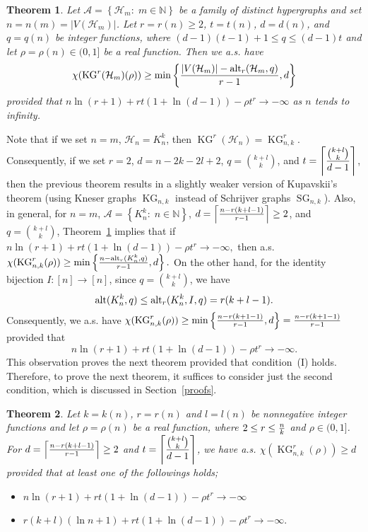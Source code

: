 \documentclass[11pt]{amsart}
\newtheorem{theorem}{Theorem} %
\theoremstyle{definition}
\theoremstyle{remark}
\def\ds{\displaystyle}
\def\KG{\operatorname{KG}}
\def\SG{\operatorname{SG}}
\def\alt{\operatorname{alt}}
\begin{document}
\begin{theorem}\label{thm:main}
Let ${\mathcal A}=\left\{\mathcal{H}_m:\; m\in\mathbb{N}\right\}$ be a 
family of distinct hypergraphs and set 
$n=n(m)=|V(\mathcal{H}_m)|$.  Let $r=r(n)\geq 2$, $t=t(n)$, $d=d(n)$, 
and $q=q(n)$ be integer functions, where $(d-1)(t-1)+1\leq q\leq (d-1)t$ and 
let $\rho=\rho(n)\in(0,1]$ be a real function. Then we a.s. have $$\chi(\KG^r(\mathcal{H}_m)(\rho))\geq \min\left\{{|V(\mathcal{H}_m)|-{\rm alt}_r(\mathcal{H}_m,q)\over r-1},d\right\}$$ 
provided that  ${n\ln(r+1)+rt(1+\ln (d-1))}-\rho t^r\rightarrow -\infty$ as $n$ tends to infinity.
\end{theorem} 
Note that if we set $n=m$, $\mathcal{H}_n=K_n^k$, 
then $\KG^r(\mathcal{H}_n)=\KG^r_{n,k}$.
Consequently, if we set  $r=2$, $d=n-2k-2l+2$, $q={k+l\choose k}$, and  
$t=\ds\left\lceil{{k+l\choose k}\over d-1}\right\rceil$,  then the previous theorem 
results in a slightly weaker version of Kupavskii's theorem (using Kneser graphs $\KG_{n,k}$ instead of Schrijver graphs $\SG_{n,k}$).  
Also, in general, 
for $n=m$, ${\mathcal A}=\left\{K_n^k:\; n\in\mathbb{N}\right\}$, $d= \left\lceil{n-r(k+l-1)\over r-1}\right\rceil\geq 2$, and $q={k+l\choose k}$, 
Theorem~\ref{thm:main} implies that if ${n\ln(r+1)+rt(1+\ln (d-1))}-\rho t^r\rightarrow -\infty,$
then a.s.  $\chi(\KG^r_{n,k}(\rho))\geq \min\left\{{n-{\rm alt}_r(K_n^k,q)\over r-1},d\right\}.$ 
On the other hand, for the identity bijection $I:[n]\longrightarrow [n]$, since $q=\ds{k+l\choose k}$, 
we have $$\alt(K_n^k,q)\leq {\rm alt}_r(K_n^k,I,q)= r(k+l-1).$$ Consequently, we a.s. have 
$\chi(\KG^r_{n,k}(\rho))\geq \min\left\{{n-r(k+1-1)\over r-1},d\right\}= {n-r(k+1-1)\over r-1}$ 
provided that
$${n\ln(r+1)+rt(1+\ln (d-1))}-\rho t^r\rightarrow -\infty.$$  
This observation proves the next theorem provided that condition~(I) holds.   Therefore, to prove the next theorem, it suffices to consider just the second condition, which is discussed in Section~\ref{proofs}. 
\begin{theorem}\label{main:thmkneser}
Let $k=k(n)$, $r=r(n)$ and $l=l(n)$ be nonnegative integer functions 
and let $\rho=\rho(n)$ be a real function, where $2\leq r \leq {n\over k}$ and $\rho\in(0,1]$.  For $d= \left\lceil{n-r(k+l-1)\over r-1}\right\rceil\geq 2$ 
and $t=\ds\left\lceil{{k+l\choose k}\over d-1}\right\rceil$, we have a.s.
$\chi(\KG^r_{n,k}(\rho))\geq d$ provided that at least one of the followings holds;
\begin{itemize}
\item[{\rm (I)}] ${n\ln(r+1)+rt(1+\ln (d-1))}-\rho t^r\rightarrow -\infty$
\item[{\rm (II)}] $r(k+l)(\ln n+1) +rt(1+\ln (d-1))-\rho t^r\rightarrow -\infty.$
\end{itemize}
\end{theorem}
\end{document}
